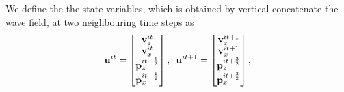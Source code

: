 \documentclass[revised,endfloat]{geophysics}
\begin{document}
We define the the state variables, which is obtained by vertical concatenate the wave field, at two neighbouring time steps as
\begin{equation}
{\bf u}^{it} = \begin{bmatrix}
{\bf v}_z^{it} \\
{\bf v}_x^{it} \\
{\bf p}_z^{it+\frac{1}{2}} \\
{\bf p}_x^{it+\frac{1}{2}} \\
\end{bmatrix}, \,\,\, 
{\bf u}^{it+1} = \begin{bmatrix}
{\bf v}_z^{it+1} \\
{\bf v}_x^{it+1} \\
{\bf p}_z^{it+\frac{3}{2}} \\
{\bf p}_x^{it+\frac{3}{2}} \\
\end{bmatrix},
\label{eq41}
\end{equation}
\end{document}

